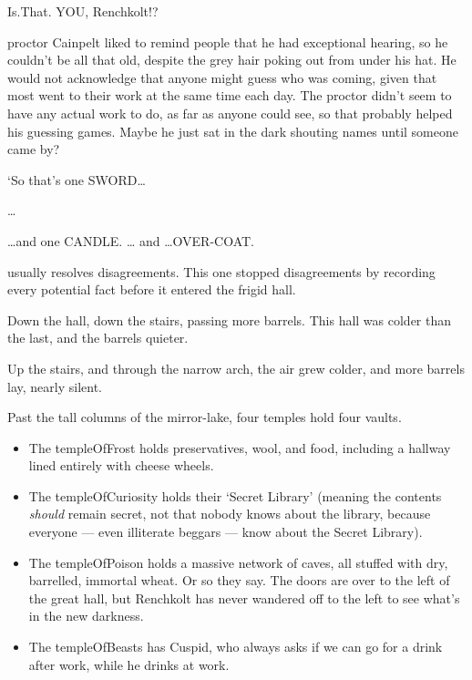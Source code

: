 \begin{exampletext}
  \begin{speechtext}
    Is.That. YOU, Renchkolt!?
  \end{speechtext}

  \Gls{proctor} Cainpelt liked to remind people that he had exceptional hearing, so he couldn't be all that old, despite the grey hair poking out from under his hat.
  He would not acknowledge that anyone might guess who was coming, given that most went to their work at the same time each day.
  The \gls{proctor} didn't seem to have any actual work to do, as far as anyone could see, so that probably helped his guessing games.
  Maybe he just sat in the dark shouting names until someone came by?

  \begin{speechtext}
    `So that's one SWORD\ldots

    \ldots

    \ldots and one CANDLE.
    \ldots
    and
    \ldots OVER-COAT.
  \end{speechtext}

   usually resolves disagreements.
  This one stopped disagreements by recording every potential fact before it entered the frigid hall.

  Down the hall, down the stairs, passing more barrels.
  This hall was colder than the last, and the barrels quieter.

  Up the stairs, and through the narrow arch, the air grew colder, and more barrels lay, nearly silent.

  Past the tall columns of the mirror-lake, four \glspl{temple} hold four vaults.

  \begin{itemize}
    \item
    The \gls{templeOfFrost} holds preservatives, wool, and food, including a hallway lined entirely with cheese wheels.
    \item
    The \gls{templeOfCuriosity} holds their `Secret Library' (meaning the contents \emph{should} remain secret, not that nobody knows about the library, because everyone --- even illiterate beggars --- know about the Secret Library).
    \item
    The \gls{templeOfPoison} holds a massive network of caves, all stuffed with dry, barrelled, immortal wheat.
    Or so they say.
    The doors are over to the left of the great hall, but Renchkolt has never wandered off to the left to see what's in the new darkness.
    \item
    The \gls{templeOfBeasts} has Cuspid, who always asks if we can go for a drink after work, while he drinks at work.
  \end{itemize}


\end{exampletext}
